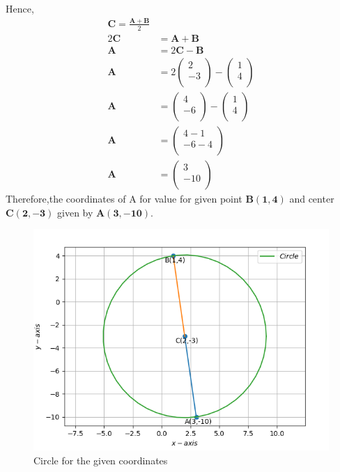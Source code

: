\documentclass[12pt]{article}
\newcommand{\myvec}[1]{\ensuremath{\begin{pmatrix}#1\end{pmatrix}}}
\let\vec\mathbf
\begin{document}
\begin{enumerate}
Hence,	
	\begin{align}
	\vec{C} = \frac{\vec{A+B}}{2} \\
	2\vec{C} &= \vec{A}+\vec{B} \\
	\vec{A} &= 2\vec{C}-\vec{B} \\
	\vec{A} &= 2\myvec{2\\-3\\}-\myvec{1\\4\\} \\
	\vec{A} &= \myvec{4\\-6\\}-\myvec{1\\4\\} \\
	\vec{A} &= \myvec{4-1\\-6-4\\} \\	
	\vec{A} &= \myvec{3\\-10\\}	
	\end{align}       
    Therefore,the coordinates of A for value for given point $\vec{B(1,4)}$ and center $\vec{C(2,-3)}$ given by $\vec{A(3,-10)}$.	
\hspace{5mm}
\begin{figure}[!h]
\begin{center}	
	\includegraphics[width=\columnwidth]{./figs/Vector1.png}
\end{center}
\caption{Circle for the given coordinates}
\label{fig:Fig}
\end{figure}
\end{enumerate}
\end{document}
